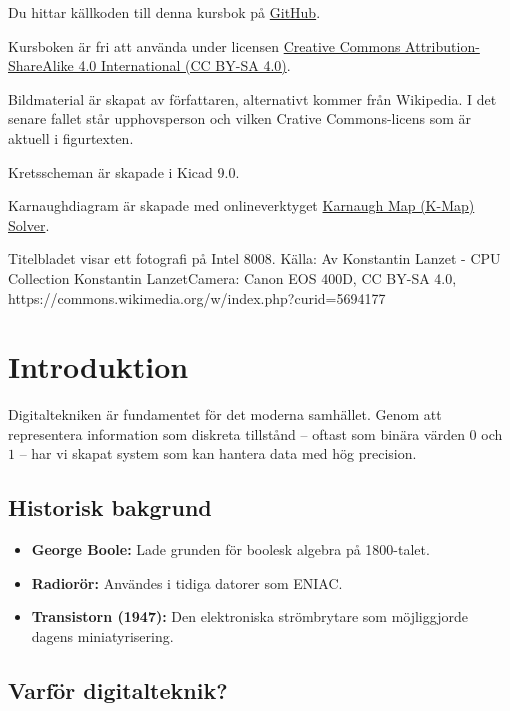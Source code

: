 \documentclass[
  swedish,
  letterpaper,
  oneside,
  openany]{book}
\providecommand{\tightlist}{%
  \setlength{\itemsep}{0pt}\setlength{\parskip}{0pt}}
\begin{document}
Du hittar källkoden till denna kursbok på
\href{https://github.com/yrgohenhal/Digitalteknik-Kursbok}{GitHub}.

Kursboken är fri att använda under licensen
\href{https://creativecommons.org/licenses/by-sa/4.0/}{Creative Commons
Attribution-ShareAlike 4.0 International (CC BY-SA 4.0)}.

Bildmaterial är skapat av författaren, alternativt kommer från
Wikipedia. I det senare fallet står upphovsperson och vilken Crative
Commons-licens som är aktuell i figurtexten.

Kretsscheman är skapade i Kicad 9.0.

Karnaughdiagram är skapade med onlineverktyget
\href{https://karnaughmapsolver.com/}{Karnaugh Map (K-Map) Solver}.

Titelbladet visar ett fotografi på Intel 8008. Källa: Av Konstantin
Lanzet - CPU Collection Konstantin LanzetCamera: Canon EOS 400D, CC
BY-SA 4.0, https://commons.wikimedia.org/w/index.php?curid=5694177


\chapter{Introduktion}\label{introduktion}

Digitaltekniken är fundamentet för det moderna samhället. Genom att
representera information som diskreta tillstånd -- oftast som binära
värden \(0\) och \(1\) -- har vi skapat system som kan hantera data med
hög precision.

\section{Historisk bakgrund}\label{historisk-bakgrund}

\begin{itemize}
\tightlist
\item
  \textbf{George Boole:} Lade grunden för boolesk algebra på 1800-talet.
\item
  \textbf{Radiorör:} Användes i tidiga datorer som ENIAC.
\item
  \textbf{Transistorn (1947):} Den elektroniska strömbrytare som
  möjliggjorde dagens miniatyrisering.
\end{itemize}

\section{Varför digitalteknik?}\label{varfuxf6r-digitalteknik}
\end{document}
